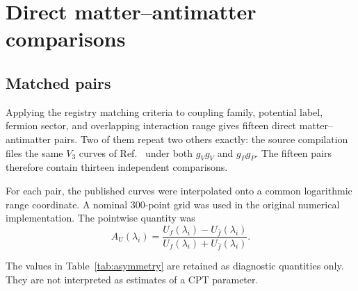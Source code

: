 \documentclass[aps,prd,reprint,superscriptaddress,nofootinbib]{revtex4-2}
\begin{document}
	\section{Direct matter--antimatter comparisons}
	
	\subsection{Matched pairs}\label{sec:pairs}
	
	Applying the registry matching criteria to coupling family, potential
label, fermion sector, and overlapping interaction range gives fifteen
direct matter--antimatter pairs. Two of them repeat two others exactly:
the source compilation files the same $V_3$ curves of
Ref.~\cite{Fadeev2022} under both $g_Vg_V$ and $g_Pg_P$. The fifteen
pairs therefore contain thirteen independent comparisons.
	
	For each pair, the published curves were interpolated onto a common
	logarithmic range coordinate. A nominal 300-point grid was used in the
	original numerical implementation. The pointwise quantity was
	\begin{equation}
		A_U(\lambda_i)
		=
		\frac{
			U_f(\lambda_i)-U_{\bar f}(\lambda_i)
		}{
			U_f(\lambda_i)+U_{\bar f}(\lambda_i)
		}.
		\label{eq:AUlambda}
	\end{equation}
	
	The values in Table~\ref{tab:asymmetry} are retained as diagnostic
	quantities only. They are not interpreted as estimates of a CPT
	parameter.
	
\end{document}
